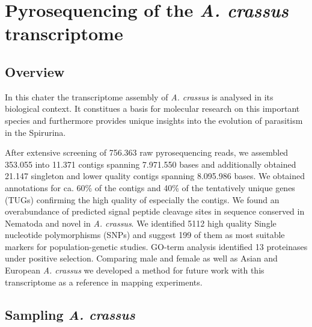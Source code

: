 
\chapter{Pyrosequencing of the \textit{A. crassus}
  transcriptome} %
\label{cha:pyro}




\ifpdf
    \graphicspath{{5_pyro/figures/PNG/}{5_pyro/figures/PDF/}{5_pyro/figures/}}
\else
    \graphicspath{{5_pyro/figures/EPS/}{5_pyro/figures/}}
\fi


\section{Overview}
\label{sec:454-overv}


In this chater the transcriptome assembly of \textit{A. crassus} is
analysed in its biological context. It constitues a basis for
molecular research on this important species and furthermore provides
unique insights into the evolution of parasitism in the Spirurina.

After extensive screening of 756.363 raw pyrosequencing reads, we
assembled 353.055 into 11.371 contigs spanning 7.971.550 bases and
additionally obtained 21.147 singleton and lower quality contigs
spanning 8.095.986 bases. We obtained annotations for ca. 60\% of the
contigs and 40\% of the tentatively unique genes (TUGs) confirming the
high quality of especially the contigs. We found an overabundance of
predicted signal peptide cleavage sites in sequence conserved in
Nematoda and novel in \textit{A. crassus}. We identified 5112 high
quality Single nucleotide polymorphisms (SNPs) and suggest 199 of them
as most suitable markers for population-genetic studies. GO-term
analysis identified 13 proteinases under positive selection. Comparing
male and female as well as Asian and European \textit{A. crassus} we
developed a method for future work with this transcriptome as a
reference in mapping experiments.


\section{Sampling \textit{A. crassus}}

